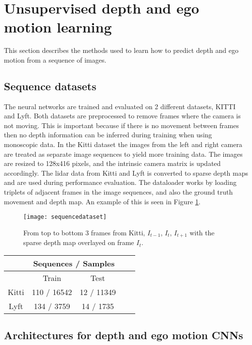 
\section{Unsupervised depth and ego motion learning}

This section describes the methods used to learn how to predict depth and ego motion from a sequence of images.

\subsection{Sequence datasets}

The neural networks are trained and evaluated on 2 different datasets, KITTI\cite{kitti} and Lyft\cite{lyft2019}. Both datasets are preprocessed to remove frames where the camera is not moving. This is important because if there is no movement between frames then no depth information can be inferred during training when using monoscopic data. In the Kitti dataset the images from the left and right camera are treated as separate image sequences to yield more training data. The images are resized to 128x416 pixels, and the intrinsic camera matrix is updated accordingly. The lidar data from Kitti and Lyft is converted to sparse depth maps and are used during performance evaluation. The dataloader works by loading triplets of adjacent frames in the image sequences, and also the ground truth movement and depth map. An example of this is seen in Figure \ref{fig:sequencedataset}.

\begin{figure}[H]
	\centering
	\texttt{[image: sequencedataset]}
	\caption{From top to bottom 3 frames from Kitti, $I_{t-1}$, $I_t$, $I_{t+1}$ with the sparse depth map overlayed on frame $I_t$.}
	\label{fig:sequencedataset}
\end{figure}

\begin{center}
	\begin{tabular}{ |c|c|c|c|c| } 
		\hline
		 &\multicolumn{2}{c|}{Sequences / Samples} \\ 
		 \hline
		 & Train & Test \\ 
		\hline
		Kitti & 110 / 16542 & 12 / 11349 \\ 
		\hline
		Lyft & 134 / 3759 & 14 / 1735 \\ 
		\hline
	\end{tabular}
\end{center}

\subsection{Architectures for depth and ego motion CNNs}


